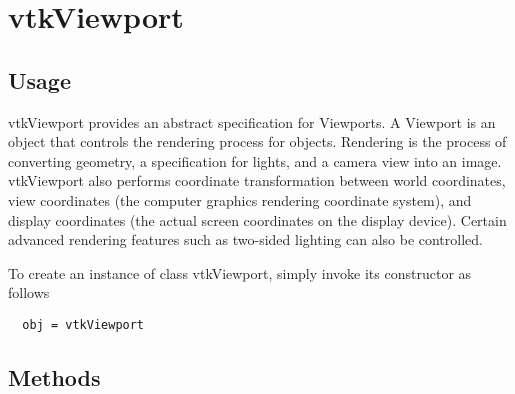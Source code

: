 \section{vtkViewport}

\subsection{Usage}

 vtkViewport provides an abstract specification for Viewports. A Viewport
 is an object that controls the rendering process for objects. Rendering
 is the process of converting geometry, a specification for lights, and
 a camera view into an image. vtkViewport also performs coordinate
 transformation between world coordinates, view coordinates (the computer
 graphics rendering coordinate system), and display coordinates (the
 actual screen coordinates on the display device). Certain advanced
 rendering features such as two-sided lighting can also be controlled.

To create an instance of class vtkViewport, simply
invoke its constructor as follows
\begin{verbatim}
  obj = vtkViewport
\end{verbatim}
\subsection{Methods}

